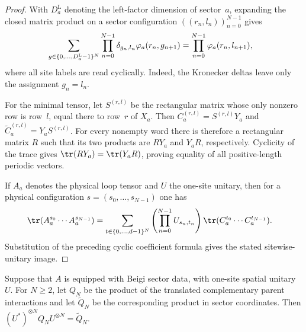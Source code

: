 \begin{proof}\leanok
    With $D_a^{\mathrm L}$ denoting the left-factor dimension of sector~$a$,
    expanding the closed matrix product on a sector configuration
    $((r_n,l_n))_{n=0}^{N-1}$ gives
    \begin{align}
         & \sum_{g\in\{0,\ldots,D_a^{\mathrm L}-1\}^N}
        \prod_{n=0}^{N-1}
        \delta_{g_n,l_n}
        \varphi_a\!\left(r_n,g_{n+1}\right) =
        \prod_{n=0}^{N-1}\varphi_a(r_n,l_{n+1}), \notag
    \end{align}
    where all site labels are read cyclically. Indeed, the Kronecker deltas
    leave only the assignment $g_n=l_n$.

    For the minimal tensor, let $S^{(r,l)}$ be the rectangular matrix whose
    only nonzero row is row~$l$, equal there to row~$r$ of $X_a$. Then
    $C_a^{(r,l)}=S^{(r,l)}Y_a$ and
    $\widetilde C_a^{(r,l)}=Y_aS^{(r,l)}$. For every nonempty word there is
    therefore a rectangular matrix $R$ such that its two products are $RY_a$
    and $Y_aR$, respectively. Cyclicity of the trace gives
    $\tr(RY_a)=\tr(Y_aR)$, proving equality of all positive-length periodic
    vectors.

    If $A_a$ denotes the physical loop tensor and $U$ the one-site unitary,
    then for a physical configuration $s=(s_0,\ldots,s_{N-1})$ one has
    \begin{align}
        \tr(A_a^{s_0}\cdots A_a^{s_{N-1}})
         & =
        \sum_{t\in\{0,\ldots,d-1\}^N}
        \left(\prod_{n=0}^{N-1}U_{s_n,t_n}\right)
        \tr(C_a^{t_0}\cdots C_a^{t_{N-1}}). \notag
    \end{align}
    Substitution of the preceding cyclic coefficient formula gives the stated
    sitewise-unitary image.
\end{proof}

\begin{lemma}
    \label{thm:beigi_complement_product_conjugation}
    \leanok
    Suppose that $A$ is equipped with Beigi sector data, with one-site spatial
    unitary $U$. For $N\geq2$, let $Q_N$ be the product of the translated
    complementary parent interactions and let $\widetilde Q_N$ be the
    corresponding product in sector coordinates. Then
    $(U^*)^{\otimes N}Q_NU^{\otimes N} = \widetilde Q_N$.
\end{lemma}

